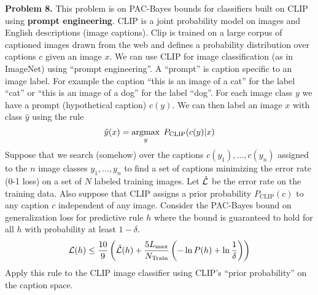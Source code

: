\documentclass{article}
\newcommand{\solution}[1]{}
\begin{document}
\bigskip
{\bf Problem 8.} This problem is on PAC-Bayes bounds for classifiers built on CLIP using {\bf prompt engineering}.  CLIP is a joint probability model on images
and English descriptions (image captions).  Clip is trained on a large corpus of captioned images drawn from the web and defines a probability distribution over captions $c$ given an image $x$.
We can use CLIP for image classification (as in ImageNet) using ``prompt engineering''.  A ``prompt'' is caption specific to an image label.  For example the caption ``this is an image of a cat'' for the label ``cat'' or ``this is an image of a dog''
for the label ``dog''. For each image class $y$ we have a prompt (hypothetical caption) $c(y)$.
We can then label an image $x$ with class $\hat{y}$ using the rule
$$\hat{y}(x) = \operatorname*{argmax}_y \;P_{\mathrm{CLIP}}(c(y)|x)$$
Suppose that we search (somehow) over the captions $c(y_1),\ldots,c(y_n)$ assigned to the $n$
image classes $y_1,\ldots,y_n$ to find a set of captions minimizing the error rate (0-1 loss) on a set of $N$ labeled training images.  Let $\hat{\cal L}$ be the error rate on the training data.
Also suppose that CLIP assigns a prior probability $P_{\mathrm{CLIP}}(c)$ to any caption $c$ independent of any image.  Consider the PAC-Bayes bound on generalization loss for predictive rule $h$
where the bound is guaranteed to hold for all $h$ with probability at least $1-\delta$.
$${\cal L}(h) \leq \frac{10}{9}\left(\hat{{\cal L}}(h) + \frac{5L_{\max}}{N_\mathrm{Train}}\left(- \ln P(h) +\ln\frac{1}{\delta}\right)\right)$$
Apply this rule to the CLIP image classifier using CLIP's ``prior probability'' on the caption space.

\solution{
  $${\cal L}(h) \leq \frac{10}{9}\left(\hat{{\cal L}}(h) + \frac{5}{N}\left(\left(\sum_y - \ln P_{\mathrm{CLIP}}(c(y))\right) +\ln\frac{1}{\delta}\right)\right)$$

  I am not proposing that searching over all captions is a good idea.  Some narrower prior is called for.
}
\end{document}

